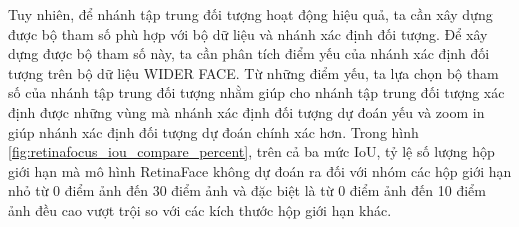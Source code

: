 {    \noindent
    Tuy nhiên, để nhánh tập trung đối tượng hoạt động hiệu quả, ta cần xây dựng được bộ tham số phù hợp với bộ dữ liệu và nhánh xác định đối tượng.
    Để xây dựng được bộ tham số này, ta cần phân tích điểm yếu của nhánh xác định đối tượng trên bộ dữ liệu WIDER FACE.
    Từ những điểm yếu, ta lựa chọn bộ tham số của nhánh tập trung đối tượng nhằm giúp cho nhánh tập trung đối tượng xác định được những vùng mà nhánh xác định đối tượng dự đoán yếu và zoom in giúp nhánh xác định đối tượng dự đoán chính xác hơn.
    Trong hình \ref{fig:retinafocus_iou_compare_percent}, trên cả ba mức IoU, tỷ lệ số lượng hộp giới hạn mà mô hình RetinaFace không dự đoán ra đối với nhóm các hộp giới hạn nhỏ từ 0 điểm ảnh đến 30 điểm ảnh và đặc biệt là từ 0 điểm ảnh đến 10 điểm ảnh đều cao vượt trội so với các kích thước hộp giới hạn khác.

}
